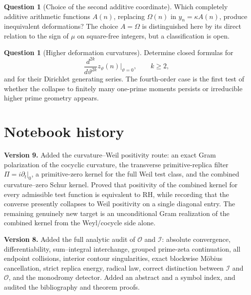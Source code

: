 \documentclass[11pt]{amsart}
\numberwithin{equation}{section}
\theoremstyle{plain}
\theoremstyle{definition}
\newtheorem{question}[theorem]{Question}
\theoremstyle{remark}
\newcommand{\Om}{\Omega}
\begin{document}
\begin{question}[Choice of the second additive coordinate]
\label{q:additive_coordinate}
Which completely additive arithmetic functions $A(n)$, replacing $\Om(n)$
in $y_n=\kappa A(n)$, produce inequivalent deformations?  The choice
$A=\Om$ is distinguished here by its direct relation to the sign of $\mu$ on
square-free integers, but a classification is open.
\end{question}


\begin{question}[Higher deformation curvatures]
\label{q:higher_curvatures}
Determine closed formulas for
\begin{equation}
\frac{d^{2k}}{d\vartheta^{2k}}z_\vartheta(n)\Big|_{\vartheta=0},
\qquad k\ge2,
\label{eq:higher_curvature_derivatives}
\end{equation}
and for their Dirichlet generating series. The fourth-order case is the first
test of whether the collapse to finitely many one-prime moments persists or
irreducible higher prime geometry appears.
\end{question}

\section{Notebook history}
\label{sec:notebook_history}

\noindent\textbf{Version 9.}
Added the curvature--Weil positivity route: an exact Gram polarization of the
cocyclic curvature, the transverse primitive-replica filter
\(\Pi=i\partial_t|_{0}\), a primitive-zero kernel for the full Weil test
class, and the combined curvature--zero Schur kernel.  Proved that positivity
of the combined kernel for every admissible test function is equivalent to RH,
while recording that the converse presently collapses to Weil positivity on a
single diagonal entry.  The remaining genuinely new target is an
unconditional Gram realization of the combined kernel from the Weyl/cocycle
side alone.


\noindent\textbf{Version 8.}
Added the full analytic audit of \(\mathcal O\) and \(\mathcal I\): absolute
convergence, differentiability, sum--integral interchange, grouped
prime-zeta continuation, all endpoint collisions, interior contour
singularities, exact blockwise M\"obius cancellation, strict replica energy,
radical law, correct distinction between \(\mathcal I\) and \(\mathcal O\),
and the monodromy detector.  Added an abstract and a symbol index, and audited
the bibliography and theorem proofs.
\end{document}
